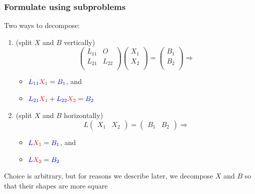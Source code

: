 \documentclass[12pt,dvipdfmx]{beamer}
\newcommand{\ao}[1]{{\color{blue}#1}}
\newcommand{\aka}[1]{{\color{red}#1}}
\begin{document}
\begin{frame}[fragile]
\frametitle{Formulate using subproblems}
Two ways to decompose:
\begin{enumerate}
\item (split $X$ and $B$ vertically)
\[
\left(
\begin{array}{cc}
L_{11}     & O \\
L_{21}     & L_{22} \\
\end{array}
\right)
\left(
\begin{array}{c}
X_1     \\
X_2     \\
\end{array}
\right)
=
\left(
\begin{array}{c}
B_1 \\
B_2 \\
\end{array}
\right)
\Rightarrow
\]
\begin{itemize}
\item $\ao{L_{11}} \aka{X_1} = \ao{B_1}$, and
\item $\ao{L_{21}} \aka{X_1} + \ao{L_{22}} \aka{X_2} = \ao{B_2}$
\end{itemize}

\item (split $X$ and $B$ horizontally)
\[ 
L
  \left(\begin{array}{cc} X_1 & X_2  \end{array}\right) = 
  \left(\begin{array}{cc} B_1 & B_2  \end{array}\right) 
  \Rightarrow
\]

\begin{itemize}
\item $\ao{L} \aka{X_1} = \ao{B_1}$, and
\item $\ao{L} \aka{X_2} = \ao{B_2}$
\end{itemize}
\end{enumerate}

Choice is arbitrary, but for reasons we describe
later, we decompose $X$ and $B$ so that their
shapes are more square

\end{frame}
\end{document}
